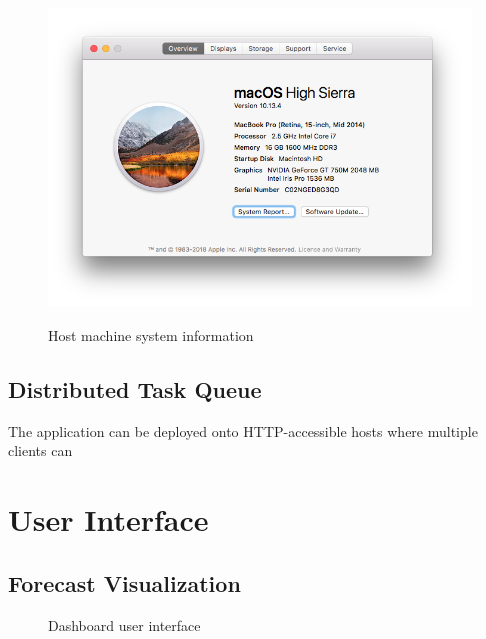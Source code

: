 \documentclass[11pt, oneside]{article}
\begin{document}
\begin{figure}[h]
  \caption{Host machine system information}
  \centering
  \includegraphics[width=12.5cm]{images/System_Specs.png}
  \label{fig:System_Specs}
\end{figure}

\subsection{Distributed Task Queue}
The application can be deployed onto HTTP-accessible hosts where multiple clients can

\section{User Interface}
\label{user_interface}
\subsection{Forecast Visualization}
\begin{figure}[h]
  \caption{Dashboard user interface}
  \centering
\end{figure}
\end{document}
